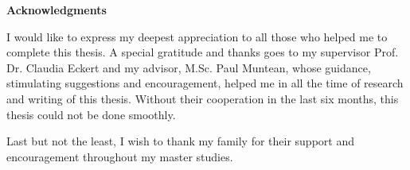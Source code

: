 \clearemptydoublepage
{}
{}	



\vspace*{2cm}

\begin{center}
{\Large \bf Acknowledgments}
\end{center}

\vspace{1cm}




I would like to express my deepest appreciation to all those who helped me to complete this thesis. A special gratitude and thanks goes to my supervisor Prof. Dr. Claudia Eckert and my advisor, M.Sc. Paul Muntean, whose guidance, stimulating suggestions and encouragement, helped me in all the time of research and writing of this thesis. Without their cooperation in the last six months, this thesis could not be done smoothly.

Last but not the least, I wish to thank my family for their support and encouragement throughout my master studies.